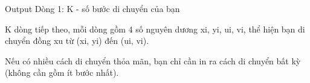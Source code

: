 Output
Dòng 1: K - số bước di chuyển của bạn  

   K dòng tiếp theo, mỗi dòng gồm 4 số nguyên dương xi, yi, ui, vi, thể hiện bạn di chuyển đồng xu từ (xi, yi) đến (ui, vi).  

   Nếu có nhiều cách di chuyển thỏa mãn, bạn chỉ cần in ra cách di chuyển bất kỳ (không cần gồm ít bước nhất).